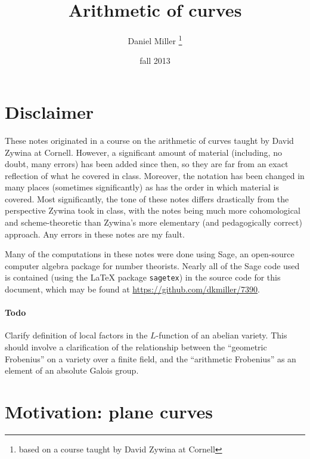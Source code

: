 \documentclass{article}
\title{Arithmetic of curves}
\author{Daniel Miller
  \thanks{based on a course taught by David Zywina at Cornell}}
\date{fall 2013}
\begin{document}
\maketitle
\tableofcontents





\newpage
\section*{Disclaimer}

These notes originated in a course on the arithmetic of curves taught by David 
Zywina at Cornell. However, a significant amount of material (including, no 
doubt, many errors) has been added since then, so they are far from an exact 
reflection of what he covered in class. Moreover, the notation has been changed 
in many places (sometimes significantly) as has the order in which material is 
covered. Most significantly, the tone of these notes differs drastically 
from the perspective Zywina took in class, with the notes being much more 
cohomological and scheme-theoretic than Zywina's more elementary (and 
pedagogically correct) approach. Any errors in these notes are my fault. 

Many of the computations in these notes were done using Sage, an open-source 
computer algebra package for number theorists. Nearly all of the Sage code 
used is contained (using the \LaTeX{} package \texttt{sagetex}) in the source 
code for this document, which may be found at 
\url{https://github.com/dkmiller/7390}. 


\paragraph{Todo}
Clarify definition of local factors in the $L$-function of an abelian variety. 
This should involve a clarification of the relationship between the ``geometric 
Frobenius'' on a variety over a finite field, and the ``arithmetic Frobenius'' 
as an element of an absolute Galois group. 










\section*{Motivation: plane curves}
\end{document}
